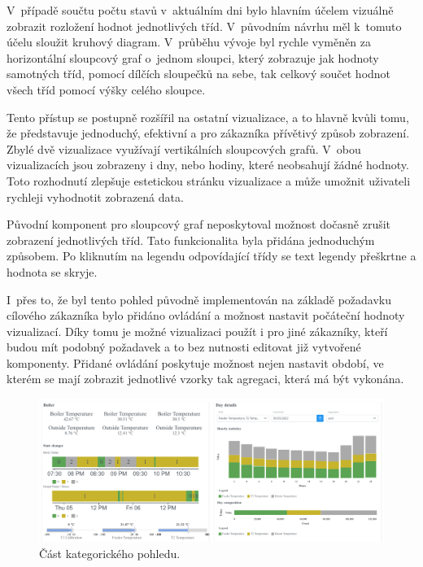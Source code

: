 V~případě součtu počtu stavů v~aktuálním dni bylo hlavním účelem vizuálně zobrazit rozložení hodnot jednotlivých tříd. V~původním návrhu měl k~tomuto účelu sloužit kruhový diagram. V~průběhu vývoje byl rychle vyměněn za horizontální sloupcový graf o~jednom sloupci, který zobrazuje jak hodnoty samotných tříd, pomocí  dílčích sloupečků na sebe, tak celkový součet hodnot všech tříd pomocí výšky celého sloupce. 

Tento přístup se postupně rozšířil na ostatní vizualizace, a to hlavně kvůli tomu, že představuje jednoduchý, efektivní a pro zákazníka přívětivý způsob zobrazení. Zbylé dvě vizualizace využívají vertikálních sloupcových grafů. V~obou vizualizacích jsou zobrazeny i dny, nebo hodiny, které neobsahují žádné hodnoty. Toto rozhodnutí zlepšuje estetickou stránku vizualizace a může umožnit uživateli rychleji vyhodnotit zobrazená data. 

Původní komponent pro sloupcový graf neposkytoval možnost dočasně zrušit zobrazení jednotlivých tříd. Tato funkcionalita byla přidána jednoduchým způsobem. Po kliknutím na legendu odpovídající třídy se text legendy přeškrtne a hodnota se skryje.

I~přes to, že byl tento pohled původně implementován na základě požadavku cílového zákazníka bylo přidáno ovládání a možnost nastavit počáteční hodnoty vizualizací. Díky tomu je možné vizualizaci použít i pro jiné zákazníky, kteří budou mít podobný požadavek a to bez nutnosti editovat již vytvořené komponenty. Přidané ovládání poskytuje možnost nejen nastavit období, ve kterém se mají zobrazit jednotlivé vzorky tak agregaci, která má být vykonána.

\begin{figure}[H]
\label{dasboard3}
\begin{center}
    \includegraphics[width=\textwidth]{obrazky-figures/dashboard3.pdf}
\end{center}
\caption{Část kategorického pohledu.}
\end{figure}

